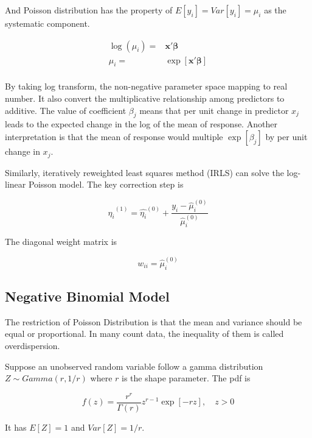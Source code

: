 \documentclass[
  11pt,
  openany]{memoir}
\begin{document}
And Poisson distribution has the property of \(E[y_i]=Var[y_i]=\mu_i\) as the systematic component.

\begin{equation}
\begin{split}
\log(\mu_i)=&\mathbf{x}'\boldsymbol{\beta}\\
\mu_i=&\exp[\mathbf{x}'\boldsymbol{\beta}]\\
\end{split}
\end{equation}

By taking log transform, the non-negative parameter space mapping to real number.
It also convert the multiplicative relationship among predictors to additive.
The value of coefficient \(\beta_j\) means that per unit change in predictor \(x_j\) leads to the expected change in the log of the mean of response.
Another interpretation is that the mean of response would multiple \(\exp[\beta_j]\) by per unit change in \(x_j\).

Similarly, iteratively reweighted least squares method (IRLS) can solve the log-linear Poisson model.
The key correction step is

\begin{equation}
\hat{\eta_i}^{(1)}=\hat{\eta_i}^{(0)} + \frac{y_i-\hat\mu_i^{(0)}}{\hat\mu_i^{(0)}}
\end{equation}

The diagonal weight matrix is

\begin{equation}
w_{ii}=\hat\mu_i^{(0)}
\end{equation}

\hypertarget{negative-binomial-model}{%
\subsection{Negative Binomial Model}\label{negative-binomial-model}}

The restriction of Poisson Distribution is that the mean and variance should be equal or proportional.
In many count data, the inequality of them is called overdispersion.

Suppose an unobserved random variable follow a gamma distribution \(Z\sim Gamma(r,1/r)\) where \(r\) is the shape parameter. The pdf is

\begin{equation}
f(z)=\frac{r^r}{\Gamma(r)}z^{r-1}\exp[-rz],\quad z>0
\end{equation}

It has \(E[Z]=1\) and \(Var[Z]=1/r\).
\end{document}
